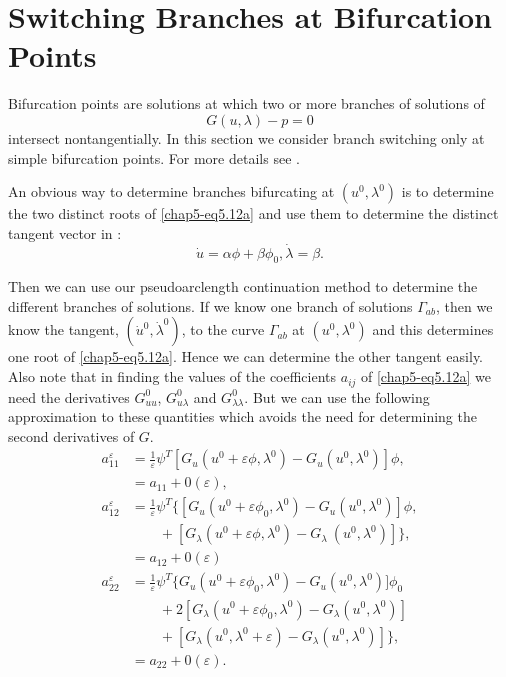 \setcounter{section}{25}
\section{Switching Branches at Bifurcation Points}\label{chap5-sec5.26}

Bifurcation points are solutions at which two or more branches of
solutions of  
\begin{equation*}
G(u, \lambda) - p = 0 \tag{5.27}\label{chap5-eq5.27}
\end{equation*}
intersect nontangentially. In this section we consider branch switching
only at simple bifurcation points. For more details see \cite{key19}. 

\medskip
{}
An obvious way to determine branches bifurcating at $(u^{0},
\lambda^{0})$ is to determine the two distinct roots of
\eqref{chap5-eq5.12a} and 
use them to determine the distinct tangent vector in : 
\begin{equation*}
\dot{u} = \alpha \phi + \beta \phi_{0}, \dot{\lambda} =
\beta. \tag{5.28}\label{chap5-eq5.28} 
\end{equation*}

Then we can use our pseudoarclength continuation method to determine
the different branches of solutions. If we know one branch of
solutions $\Gamma_{ab}$, then we know the tangent, $(\dot{u}^{0},
\dot{\lambda}^{0})$, to the curve $\Gamma_{ab}$ at $(u^{0},
\lambda^{0})$ and this determines one root of
\eqref{chap5-eq5.12a}. Hence we can 
determine the other tangent easily. Also note that in finding the
values of the coefficients $a_{ij}$ of \eqref{chap5-eq5.12a} we need the
derivatives $G^{0}_{uu}$, $G^{0}_{u \lambda}$ and $G^{0}_{\lambda
  \lambda}$. But we can use the\pageoriginale 
following approximation to these
quantities which avoids the need for determining the second derivatives
of $G$.  
\begin{align*}
a^{\varepsilon}_{11} & = \frac{1}{\varepsilon} \psi^{T} [G_{u}(u^{0} +
  \varepsilon \phi , \lambda^{0}) - G_{u}(u^{0}, \lambda^{0})] \phi,
\\ 
& = a_{11} + 0(\varepsilon), \\ 
a^{\varepsilon}_{12} & = \frac{1}{\varepsilon} \psi^{T} \{[G_{u}(u^{0}
  + \varepsilon \phi_{0} , \lambda^{0}) - G_{u}(u^{0}, \lambda^{0})]
\phi, \\
& \qquad + [G_{\lambda}(u^{0} + \varepsilon \phi , \lambda^{0}) -
  G_{\lambda}~(u^{0},\lambda^{0})]\}, \\ 
& = a_{12} + 0(\varepsilon)\\ 
a^{\varepsilon}_{22} & = \frac{1}{\varepsilon} \psi^{T} \{ G_{u}(u^{0}
+ \varepsilon \phi_{0} , \lambda^{0}) - G_{u}(u^{0}, \lambda^{0})]
\phi_{0} \\
& \qquad + 2[G_{\lambda} (u^{0} + \varepsilon \phi_{0}, \lambda^{0}) -
  G_{\lambda} (u^{0}, \lambda^{0})]\\ 
& \qquad + [G_{\lambda} (u^{0}, \lambda^{0}
  + \varepsilon ) - G_{\lambda} (u^{0}, \lambda^{0})]\},\\ 
&= a_{22} + 0 (\varepsilon).
 \end{align*} 

